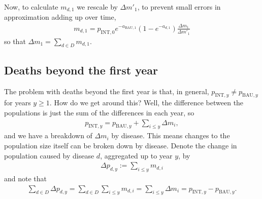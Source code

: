 \documentclass[]{article}
\begin{document}
Now, to calculate $m_{d, 1}$ we rescale by $\Delta m'_1$, to prevent small errors in approximation adding up over time,
\begin{align*}
	m_{d, 1} = p_{\text{INT}, 0} e^{-a_{\text{BAU}, 1}} \left(1 - e^{-a_{d, 1}}\right) \frac{\Delta m_1}{\Delta m'_1} 
\end{align*}
so that $\Delta m_1 = \sum_{d \in D} m_{d, 1}$.

\subsection{Deaths beyond the first year}

The problem with deaths beyond the first year is that, in general, $p_{\text{INT}, y} \neq p_{\text{BAU}, y}$ for years $y \geq 1$. How do we get around this? Well, the difference between the populations is just the sum of the differences in each year, so
\begin{align*}
	p_{\text{INT}, y} = p_{\text{BAU}, y} + \sum_{i \leq y} \Delta m_i,
\end{align*}
and we have a breakdown of $\Delta m_i$ by disease. This means changes to the population size itself can be broken down by disease. Denote the change in population caused by disease $d$, aggregated up to year $y$, by
\begin{align*}
	\Delta p_{d, y} := \sum_{i \leq y} m_{d,i}
\end{align*}
and note that 
\begin{align*}
		\sum_{d \in D} \Delta p_{d, y} = \sum_{d \in D}\sum_{i \leq y} m_{d,i} = \sum_{i \leq y} \Delta m_i = p_{\text{INT}, y} - p_{\text{BAU}, y}.
\end{align*}
\end{document}
